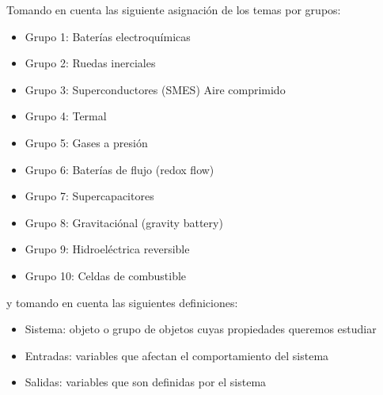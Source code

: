 \documentclass[12pt]{article}
\begin{document}


\noindent Tomando en cuenta las siguiente asignación de los temas por grupos:
\begin{itemize}
    \item Grupo 1: Baterías electroquímicas
    \item Grupo 2: Ruedas inerciales 
    \item Grupo 3: Superconductores (SMES) Aire comprimido
    \item Grupo 4: Termal 
    \item Grupo 5: Gases a presión
    \item Grupo 6: Baterías de flujo (redox flow) 
    \item Grupo 7: Supercapacitores 
    \item Grupo 8: Gravitaciónal (gravity battery)
    \item Grupo 9: Hidroeléctrica reversible 
    \item Grupo 10: Celdas de combustible
\end{itemize}
y tomando en cuenta las siguientes definiciones:
\begin{itemize}
    \item Sistema: objeto o grupo de objetos cuyas propiedades queremos estudiar
    \item Entradas: variables que afectan el comportamiento del sistema
    \item Salidas: variables que son definidas por el sistema
\end{itemize}
\end{document}
